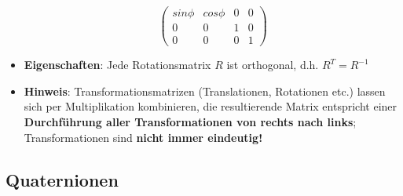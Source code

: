 \begin{itemize}
$$\begin{pmatrix}
		sin\phi & cos\phi & 0 & 0\\
		0 & 0 & 1 & 0\\
		0 & 0 & 0 & 1
	\end{pmatrix}$$
	\item \textbf{Eigenschaften}: Jede Rotationsmatrix $R$ ist orthogonal, d.h. $R^T = R^{-1}$
	\item \textbf{Hinweis}: Transformationsmatrizen (Translationen, Rotationen etc.) lassen sich per Multiplikation kombinieren, die resultierende Matrix entspricht einer \textbf{Durchführung aller Transformationen von rechts nach links}; Transformationen sind \textbf{nicht immer eindeutig!}
\end{itemize}

\subsection{Quaternionen}%
\label{gtrans:sub:quaternionen}

